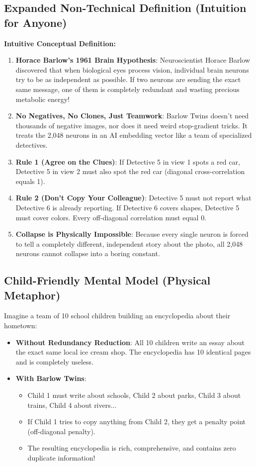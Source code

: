 \documentclass[11pt,a4paper]{article}
\theoremstyle{definition}
\begin{document}
\subsection{Expanded Non-Technical Definition (Intuition for Anyone)}
\textbf{Intuitive Conceptual Definition:}
\begin{enumerate}
    \item \textbf{Horace Barlow's 1961 Brain Hypothesis}: Neuroscientist Horace Barlow discovered that when biological eyes process vision, individual brain neurons try to be as independent as possible. If two neurons are sending the exact same message, one of them is completely redundant and wasting precious metabolic energy!
    \item \textbf{No Negatives, No Clones, Just Teamwork}: Barlow Twins doesn't need thousands of negative images, nor does it need weird stop-gradient tricks. It treats the 2,048 neurons in an AI embedding vector like a team of specialized detectives.
    \item \textbf{Rule 1 (Agree on the Clues)}: If Detective 5 in view 1 spots a red car, Detective 5 in view 2 must also spot the red car (diagonal cross-correlation equals 1).
    \item \textbf{Rule 2 (Don't Copy Your Colleague)}: Detective 5 must not report what Detective 6 is already reporting. If Detective 6 covers shapes, Detective 5 must cover colors. Every off-diagonal correlation must equal 0.
    \item \textbf{Collapse is Physically Impossible}: Because every single neuron is forced to tell a completely different, independent story about the photo, all 2,048 neurons cannot collapse into a boring constant.
\end{enumerate}

\subsection{Child-Friendly Mental Model (Physical Metaphor)}
Imagine a team of 10 school children building an encyclopedia about their hometown:
\begin{itemize}
    \item \textbf{Without Redundancy Reduction}: All 10 children write an essay about the exact same local ice cream shop. The encyclopedia has 10 identical pages and is completely useless.
    \item \textbf{With Barlow Twins}:
    \begin{itemize}
        \item Child 1 must write about schools, Child 2 about parks, Child 3 about trains, Child 4 about rivers...
        \item If Child 1 tries to copy anything from Child 2, they get a penalty point (off-diagonal penalty).
        \item The resulting encyclopedia is rich, comprehensive, and contains zero duplicate information!
    \end{itemize}
\end{itemize}
\end{document}
